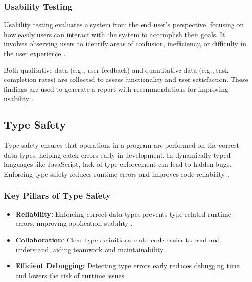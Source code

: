 \subsubsection*{Usability Testing}
\label{subsec:usability-testing}

Usability testing evaluates a system from the end user’s perspective, focusing on how easily users can interact with the system to accomplish their goals. It involves observing users to identify areas of confusion, inefficiency, or difficulty in the user experience \cite{geeksforgeeks:user-test}.

Both qualitative data (e.g., user feedback) and quantitative data (e.g., task completion rates) are collected to assess functionality and user satisfaction. These findings are used to generate a report with recommendations for improving usability \cite{geeksforgeeks:user-test}.


\subsection{Type Safety}
\label{subsec:type-safety}

Type safety ensures that operations in a program are performed on the correct data types, helping catch errors early in development. In dynamically typed languages like JavaScript, lack of type enforcement can lead to hidden bugs. Enforcing type safety reduces runtime errors and improves code reliability \cite{dev:type-safety}.

\subsubsection*{Key Pillars of Type Safety}
\label{subsubsec:type-safety-pillars}

\begin{itemize}
\item \textbf{Reliability:} Enforcing correct data types prevents type-related runtime errors, improving application stability \cite{dev:type-safety}.

\item \textbf{Collaboration:} Clear type definitions make code easier to read and understand, aiding teamwork and maintainability \cite{dev:type-safety}.

\item \textbf{Efficient Debugging:} Detecting type errors early reduces debugging time and lowers the risk of runtime issues \cite{dev:type-safety}.
\end{itemize}
